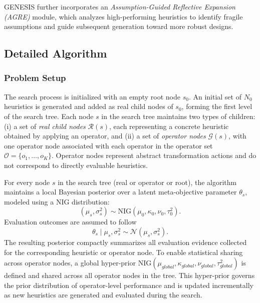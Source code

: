 \documentclass[sigconf,anonymous]{aamas}
\begin{document}
GENESIS further incorporates an \emph{Assumption-Guided Reflective Expansion (AGRE)} module, which analyzes high-performing heuristics to identify fragile assumptions and guide subsequent generation toward more robust designs.

\subsection{Detailed Algorithm}

\subsubsection{Problem Setup}

The search process is initialized with an empty root node \(s_0\). An initial set of \(N_0\) heuristics is generated and added as real child nodes of \(s_0\), forming the first level of the search tree. Each node $s$ in the search tree maintains two types of children:
(i) a set of \emph{real child nodes} $\mathcal{R}(s)$, each representing a concrete heuristic obtained by applying an operator, and
(ii) a set of \emph{operator nodes} $\mathcal{G}(s)$, with one operator node associated with each operator in the operator set $\mathcal{O} = \{o_1,\dots,o_K\}$. Operator nodes represent abstract transformation actions and do not correspond to directly evaluable heuristics.

For every node \(s\) in the search tree (real or operator or root), the algorithm maintains a local Bayesian posterior over a latent meta-objective parameter \(\theta_s\), modeled using a NIG distribution:
\begin{equation}
(\mu_s, \sigma_s^2) \sim \mathrm{NIG}(\mu_0, \kappa_0, \nu_0, \tau_0^2).
\end{equation}
Evaluation outcomes are assumed to follow
\begin{equation}
\theta_s \mid \mu_s, \sigma_s^2 \sim \mathcal{N}(\mu_s, \sigma_s^2).
\end{equation}
The resulting posterior compactly summarizes all evaluation evidence collected for the corresponding heuristic or operator node. To enable statistical sharing across operator nodes, a global hyper-prior $\text{NIG}(\mu_{global}, \kappa_{global}, \nu_{global}, \tau_{global}^2)$ is defined and shared across all operator nodes in the tree. This hyper-prior governs the prior distribution of operator-level performance and is updated incrementally as new heuristics are generated and evaluated during the search.
\end{document}
